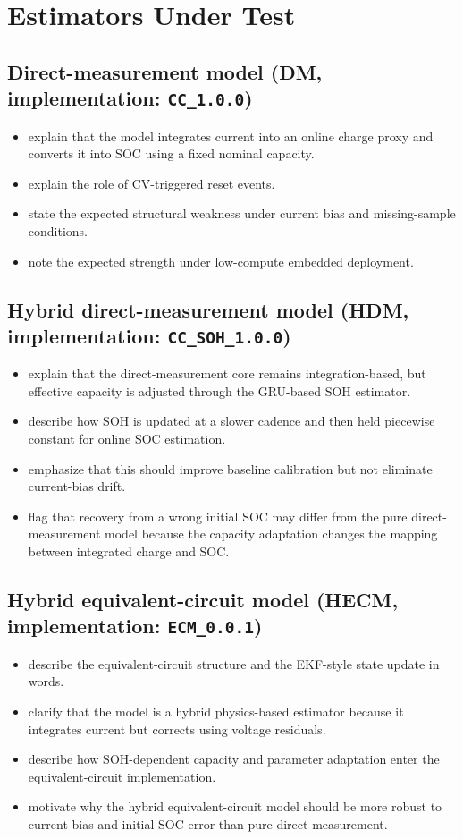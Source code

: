 \documentclass[review]{elsarticle}
\begin{document}
\section{Estimators Under Test}
\subsection{Direct-measurement model (DM, implementation: \texttt{CC\_1.0.0})}
\begin{itemize}[leftmargin=*]
    \item explain that the model integrates current into an online charge proxy and converts it into SOC using a fixed nominal capacity.
    \item explain the role of CV-triggered reset events.
    \item state the expected structural weakness under current bias and missing-sample conditions.
    \item note the expected strength under low-compute embedded deployment.
\end{itemize}

\subsection{Hybrid direct-measurement model (HDM, implementation: \texttt{CC\_SOH\_1.0.0})}
\begin{itemize}[leftmargin=*]
    \item explain that the direct-measurement core remains integration-based, but effective capacity is adjusted through the GRU-based SOH estimator.
    \item describe how SOH is updated at a slower cadence and then held piecewise constant for online SOC estimation.
    \item emphasize that this should improve baseline calibration but not eliminate current-bias drift.
    \item flag that recovery from a wrong initial SOC may differ from the pure direct-measurement model because the capacity adaptation changes the mapping between integrated charge and SOC.
\end{itemize}

\subsection{Hybrid equivalent-circuit model (HECM, implementation: \texttt{ECM\_0.0.1})}
\begin{itemize}[leftmargin=*]
    \item describe the equivalent-circuit structure and the EKF-style state update in words.
    \item clarify that the model is a hybrid physics-based estimator because it integrates current but corrects using voltage residuals.
    \item describe how SOH-dependent capacity and parameter adaptation enter the equivalent-circuit implementation.
    \item motivate why the hybrid equivalent-circuit model should be more robust to current bias and initial SOC error than pure direct measurement.
\end{itemize}
\end{document}
